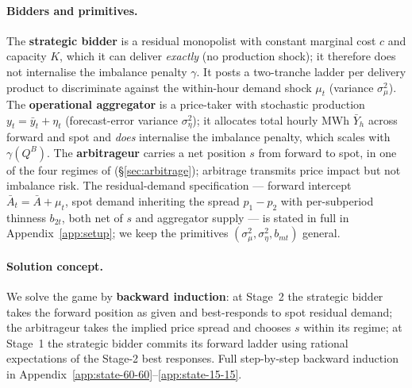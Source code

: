 \documentclass[11pt]{article}
\begin{document}
\paragraph{Bidders and primitives.} The \textbf{strategic bidder} is a residual monopolist with constant marginal cost $c$ and capacity $K$, which it can deliver \emph{exactly} (no production shock); it therefore does not internalise the imbalance penalty $\gamma$. It posts a two-tranche ladder per delivery product to discriminate against the within-hour demand shock $\mu_t$ (variance $\sigma_\mu^2$). The \textbf{operational aggregator} is a price-taker with stochastic production $y_t = \bar y_t + \eta_t$ (forecast-error variance $\sigma_\eta^2$); it allocates total hourly MWh $\bar Y_h$ across forward and spot and \emph{does} internalise the imbalance penalty, which scales with $\gamma(Q^B)$. The \textbf{arbitrageur} carries a net position $s$ from forward to spot, in one of the four regimes of \citeauthor{ito_reguant_2016} (\S\ref{sec:arbitrage}); arbitrage transmits price impact but not imbalance risk. The \citeauthor{ito_reguant_2016} residual-demand specification --- forward intercept $\bar A_t = \bar A + \mu_t$, spot demand inheriting the spread $p_1 - p_2$ with per-subperiod thinness $b_{2t}$, both net of $s$ and aggregator supply --- is stated in full in Appendix~\ref{app:setup}; we keep the primitives $(\sigma_\mu^2, \sigma_\eta^2, b_{mt})$ general.

\paragraph{Solution concept.} We solve the game by \textbf{backward induction}: at Stage~2 the strategic bidder takes the forward position as given and best-responds to spot residual demand; the arbitrageur takes the implied price spread and chooses $s$ within its regime; at Stage~1 the strategic bidder commits its forward ladder using rational expectations of the Stage-2 best responses. Full step-by-step backward induction in Appendix~\ref{app:state-60-60}--\ref{app:state-15-15}.
\end{document}
